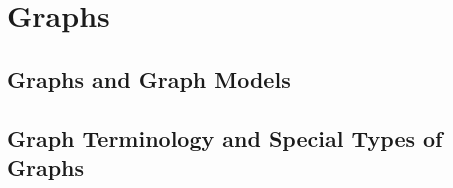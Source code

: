 \documentclass[../discrete.tex]{subfiles}
\begin{document}
\chapter{Graphs}
\section{Graphs and Graph Models}
\section{Graph Terminology and Special Types of Graphs}
\end{document}

